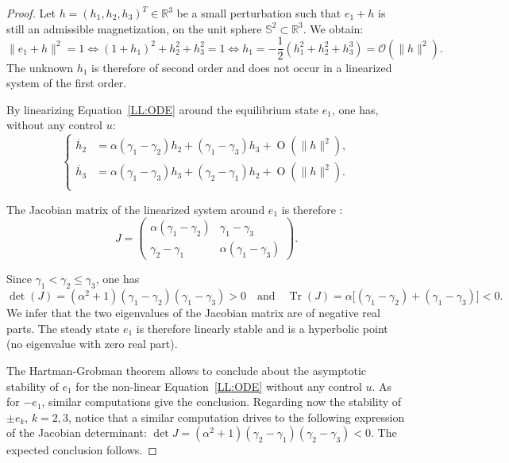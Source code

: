 \documentclass[JEP,XML,SOM,Unicode,NoEqCountersInSection,NoFloatCountersInSection,published]{cedram}
\theoremstyle{definition}
\newcommand{\R} {\mathbb{R}}
\begin{document}
\begin{proof}
Let $h=(h_1, h_2, h_3)^T\in\R^3$ be a small perturbation such that $e_1+h$ is still an admissible magnetization, \ie on the unit sphere $\mathbb{S}^2\subset\R^3$. We obtain:
\begin{equation*}
\|e_1+h\|^2=1\iff (1+h_1)^2+h_2^2+h_3^2=1
\iff h_1=-\frac{1}{2}\left(h_1^2+h_2^2+h_3^3\right)=\mathcal{O}(\|h\|^2).
\end{equation*}
The unknown $h_1$ is therefore of second order and does not occur in a linearized system of the first order.

By linearizing Equation~\eqref{LL:ODE} around the equilibrium state $e_1$, one has, without any control $u$:
\begin{equation}
\left\{
\begin{aligned}
\dot{h_2} & =\alpha(\gamma_1-\gamma_2)h_2+(\gamma_1-\gamma_3)h_3+\operatorname{O}(\|h\|^2),\\
\dot{h_3} & =\alpha(\gamma_1-\gamma_3)h_3+(\gamma_2-\gamma_1)h_2+\operatorname{O}(\|h\|^2).\\
\end{aligned}
\right.
\end{equation}

The Jacobian matrix of the linearized system around $e_1$ is therefore :
\[ J=\begin{pmatrix}\alpha(\gamma_1-\gamma_2)&\gamma_1-\gamma_3\\
\gamma_2-\gamma_1&\alpha(\gamma_1-\gamma_3)\end{pmatrix}.\]

Since $\gamma_1<\gamma_2\leq\gamma_3$, one has
\[
\det (J)\!=\!(\alpha^2+1)(\gamma_1-\gamma_2)(\gamma_1-\gamma_3)\!>\!0\quad \text{and}\quad
\operatorname{Tr}(J)\!=\!\alpha\bigl[(\gamma_1-\gamma_2)+(\gamma_1-\gamma_3)\bigr]\!<\!0.
\]
We infer that the two eigenvalues of the Jacobian matrix are of negative real parts. The steady state $e_1$ is therefore linearly stable and is {a hyperbolic point} (no eigenvalue with zero real part).

{The Hartman-Grobman theorem} \cite{perko2013differential} allows to conclude about the asymptotic stability of $e_1$ for the non-linear Equation~\eqref{LL:ODE} without any control $u$. As for $- e_1$, similar computations give the conclusion. Regarding now the stability of $\pm e_k$, $k=2,3$, notice that a similar computation drives to the following expression of the Jacobian determinant: $\det J=(\alpha^2+1)(\gamma_2-\gamma_1)(\gamma_2-\gamma_3)<0$. The expected conclusion follows.
\end{proof}
\end{document}
